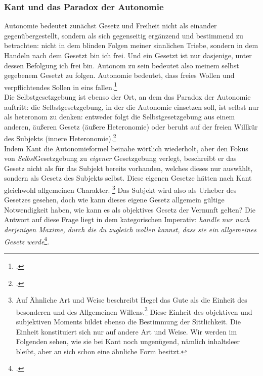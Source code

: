 \documentclass[12pt, a4paper, openany]{report}
\begin{document}
\subsubsection{Kant und das Paradox der Autonomie}
Autonomie bedeutet zunächst Gesetz und Freiheit nicht als einander gegenübergestellt, sondern als sich gegenseitig ergänzend und bestimmend zu betrachten: 
nicht in dem blinden Folgen meiner sinnlichen Triebe, sondern in dem Handeln nach dem Gesetzt bin ich frei. 
Und ein Gesetzt ist nur dasjenige, unter dessen Befolgung ich frei bin. 
Autonom zu sein bedeutet also meinem selbst gegebenem Gesetzt zu folgen. 
Autonomie bedeutet, dass freies Wollen und verpflichtendes Sollen in eins fallen.\footcite[Vgl.][19]{menke_autonomie_2018}\\
Die Selbstgesetzgebung ist ebenso der Ort, an dem das Paradox der Autonomie auftritt: 
die Selbstgesetzgebung, in der die Autonomie einsetzen soll, ist selbst nur als heteronom zu denken: 
entweder folgt die Selbstgesetzgebung aus einem anderen, äußeren Gesetz (äußere Heteronomie) oder beruht auf der freien Willkür des Subjekts (innere Heteronomie).\footcite[Vgl.][20]{menke_autonomie_2018}\\
Indem Kant die Autonomieformel beinahe wörtlich wiederholt, aber den Fokus von \textit{Selbst}Gesetzgebung zu \textit{eigener} Gesetzgebung verlegt, beschreibt er das Gesetz nicht als für das Subjekt bereits vorhanden, welches dieses nur auswählt, sondern als Gesetz des Subjekts selbst.
Diese eigenen Gesetze hätten nach Kant gleichwohl allgemeinen Charakter.
\footnote{
    \cite[Vgl.][65.]{kant_kritik_2014} 
    Auf Ähnliche Art und Weise beschreibt Hegel das Gute als die Einheit des besonderen und des Allgemeinen Willens.\footcite[Vgl.][§129, S. 134.]{hegel_grundlinien_2017}
    Diese Einheit des objektiven und subjektiven Moments bildet ebenso die Bestimmung der Sittlichkeit.
    Die Einheit konstituiert sich nur auf andere Art und Weise. 
    Wir werden im Folgenden sehen, wie sie bei Kant noch ungenügend, nämlich inhaltsleer bleibt, aber an sich schon eine ähnliche Form besitzt.
}
Das Subjekt wird also als Urheber des Gesetzes gesehen, doch wie kann dieses eigene Gesetz allgemein gültige Notwendigkeit haben, wie kann es als objektives Gesetz der Vernunft gelten?
Die Antwort auf diese Frage liegt in dem kategorischen Imperativ: \glqq \textit{handle nur nach derjenigen Maxime, durch die du zugleich wollen kannst, dass sie ein allgemeines Gesetz werde}\grqq\footcite[][51. Im Original gesperrt gedruckt]{kant_kritik_2014}.
\end{document}

